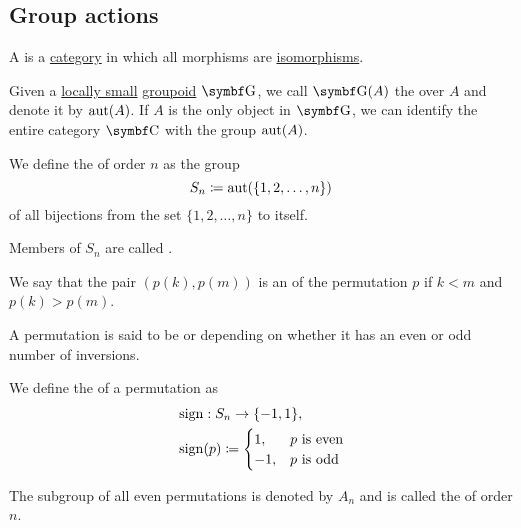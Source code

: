 \subsection{Group actions}\label{subsec:group_actions}

\begin{definition}\label{def:groupoid}
  A  is a \hyperref[def:category]{category} in which all morphisms are \hyperref[def:morphism_invertibility]{isomorphisms}.
\end{definition}

\begin{definition}\label{def:automorphism_group}
  Given a \hyperref[def:category_cardinality]{locally small} \hyperref[def:groupoid]{groupoid} \( \Cat{G} \), we call \( \Cat{G}(A) \) the  over \( A \) and denote it by \( \operatorname{aut}(A) \). If \( A \) is the only object in \( \Cat{G} \), we can identify the entire category \( \Cat{C} \) with the group \( \operatorname{aut}(A) \).
\end{definition}

\begin{definition}\label{def:symmetric_group}
  We define the  of order \( n \) as the group
  \begin{equation*}
    S_n \coloneqq \operatorname{aut}(\{ 1, 2, \ldots, n \})
  \end{equation*}
  of all bijections from the set \( \{ 1, 2, \ldots, n \} \) to itself.

  \begin{DefEnum}
     Members of \( S_n \) are called .

     We say that the pair \( (p(k), p(m)) \) is an  of the permutation \( p \) if \( k < m \) and \( p(k) > p(m) \).

     A permutation is said to be  or  depending on whether it has an even or odd number of inversions.

     We define the  of a permutation as
    \begin{align*}
       &\operatorname{sign}: S_n \to \{ -1, 1 \}, \\
       &\operatorname{sign}(p) \coloneqq \begin{cases}
        1,  &p \text{ is even} \\
        -1, &p \text{ is odd}
      \end{cases}
    \end{align*}

     The subgroup of all even permutations is denoted by \( A_n \) and is called the  of order \( n \).
  \end{DefEnum}
\end{definition}

